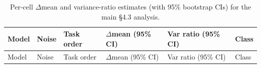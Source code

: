 \documentclass[10pt,letterpaper]{article}
\begin{document}
\begin{longtable}[]{@{}
  >{\raggedright\arraybackslash}p{}
  >{\raggedright\arraybackslash}p{}
  >{\raggedright\arraybackslash}p{}
  >{\raggedright\arraybackslash}p{}
  >{\raggedright\arraybackslash}p{}
  >{\raggedright\arraybackslash}p{}@{}}
\caption{Per-cell \(\Delta\)mean and variance-ratio estimates (with 95\%
bootstrap CIs) for the main §4.3
analysis.}\label{tbl-percell-deltas}\tabularnewline
\toprule\noalign{}
\begin{minipage}[b]{\linewidth}\raggedright
Model
\end{minipage} & \begin{minipage}[b]{\linewidth}\raggedright
Noise
\end{minipage} & \begin{minipage}[b]{\linewidth}\raggedright
Task order
\end{minipage} & \begin{minipage}[b]{\linewidth}\raggedright
\(\Delta\)mean (95\% CI)
\end{minipage} & \begin{minipage}[b]{\linewidth}\raggedright
Var ratio (95\% CI)
\end{minipage} & \begin{minipage}[b]{\linewidth}\raggedright
Class
\end{minipage} \\
\midrule\noalign{}
\endfirsthead
\toprule\noalign{}
\begin{minipage}[b]{\linewidth}\raggedright
Model
\end{minipage} & \begin{minipage}[b]{\linewidth}\raggedright
Noise
\end{minipage} & \begin{minipage}[b]{\linewidth}\raggedright
Task order
\end{minipage} & \begin{minipage}[b]{\linewidth}\raggedright
\(\Delta\)mean (95\% CI)
\end{minipage} & \begin{minipage}[b]{\linewidth}\raggedright
Var ratio (95\% CI)
\end{minipage} & \begin{minipage}[b]{\linewidth}\raggedright
Class
\end{minipage} \\

\end{longtable}
\end{document}
